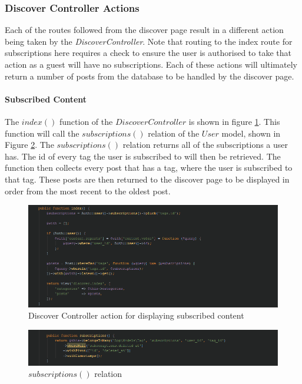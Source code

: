 \subsubsection{Discover Controller Actions}
Each of the routes followed from the discover page result in a different action being taken by the \textit{DiscoverController}. Note that routing to the index route for subscriptions here requires a check to ensure the user is authorised to take that action as a guest will have no subscriptions. Each of these actions will ultimately return a number of posts from the database to be handled by the discover page.

\paragraph{Subscribed Content}
The $index()$ function of the $Discover  Controller$ is shown in figure \ref{fig:DiscoverControllerSubscribed}. This function will call the $subscriptions()$ relation of the $User$ model, shown in Figure \ref{fig:SubscribedPosts}. The $subscriptions()$ relation returns all of the subscriptions a user has. The id of every tag the user is subscribed to will then be retrieved. The function then collects every post that has a tag, where the user is subscribed to that tag. These posts are then returned to the discover page to be displayed in order from the most recent to the oldest post.

\begin{figure}[H]
\centering
\includegraphics[width=\textwidth]{Images/Implementation/DiscoverControllerSubscribed}
\caption{Discover Controller action for displaying subscribed content}
\label{fig:DiscoverControllerSubscribed}
\end{figure}

\begin{figure}[H]
\centering
\includegraphics[width=\textwidth]{Images/Implementation/SubscribedPosts}
\caption{$subscriptions()$ relation}
\label{fig:SubscribedPosts}
\end{figure}

